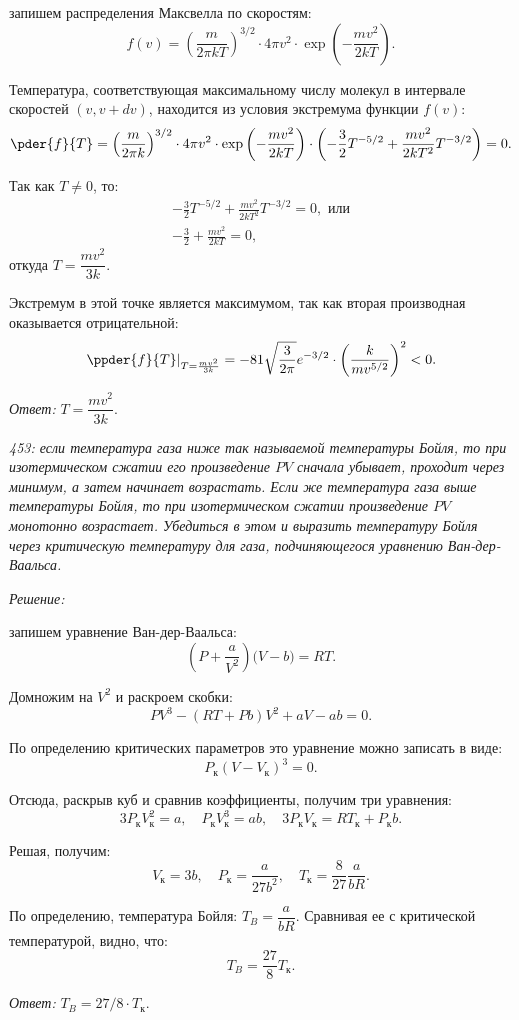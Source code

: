\documentclass[pscyr]{hedwork}
\begin{document}
запишем распределения Максвелла по скоростям:
\[
  f(v) = \left( \frac{m}{2\pi kT} \right)^{3/2}\cdot 4\pi v^2\cdot
   \exp\left( -\frac{mv^2}{2kT} \right).
\]

Температура, соответствующая максимальному числу молекул в интервале скоростей
\( (v, v + dv) \), находится из условия экстремума функции \( f(v) \):
\[
  \pder{f}{T} = \left( \frac{m}{2\pi k} \right)^{3/2}\cdot 4\pi v^2\cdot
    \exp\left( -\frac{mv^2}{2kT} \right)\cdot
    \left(-\frac{3}{2}T^{-5/2} + \frac{mv^2}{2kT^2}T^{-3/2} \right) = 0.
\]

Так как \( T \ne 0 \), то:
\begin{gather*}
  -\frac{3}{2}T^{-5/2} + \frac{mv^2}{2kT^2}T^{-3/2} = 0, \text{ или} \\
  -\frac{3}{2} + \frac{mv^2}{2kT} = 0,
\end{gather*}
откуда \( T = \dfrac{mv^2}{3k} \).

Экстремум в этой точке является максимумом, так как вторая производная
оказывается отрицательной:
\[
  \left. \ppder{f}{T} \right|_{T = \frac{mv^2}{3k}} = -81
  \sqrt{\frac{3}{2\pi}}e^{-3/2}\cdot \left( \frac{k}{mv^{5/2}} \right)^2 < 0.
\]

\vspace*{2em}
\emph{Ответ:} \( T = \dfrac{mv^2}{3k} \).

\newpage %

\emph{453: если температура газа ниже так называемой температуры Бойля, то при
изотермическом сжатии его произведение \( PV \) сначала убывает, проходит через
минимум, а затем начинает возрастать. Если же температура газа выше температуры
Бойля, то при изотермическом сжатии произведение \( PV \) монотонно возрастает.
Убедиться в этом и выразить температуру Бойля через критическую температуру для
газа, подчиняющегося уравнению Ван-дер-Ваальса.}

\vspace*{2em}
\emph{Решение:}

запишем уравнение Ван-дер-Ваальса:
\[
  \left( P + \frac{a}{V^2} \right)\Big( V - b \Big) = RT.
\]

Домножим на \( V^2 \) и раскроем скобки:
\[
  PV^3 - (RT + Pb)V^2 + aV - ab = 0.
\]

По определению критических параметров это уравнение можно записать в виде:
\[
  P_\text{к}(V - V_\text{к})^3 = 0.
\]

Отсюда, раскрыв куб и сравнив коэффициенты, получим три уравнения:
\[
  3P_\text{к}V_\text{к}^2 = a, \quad
  P_\text{к}V_\text{к}^3 = ab, \quad
  3P_\text{к}V_\text{к} = RT_\text{к} + P_\text{к}b.
\]

Решая, получим:
\[
  V_\text{к} = 3b, \quad
  P_\text{к} = \frac{a}{27b^2}, \quad
  T_\text{к} = \frac{8}{27}\frac{a}{bR}.
\]

По определению, температура Бойля: \( T_B = \dfrac{a}{bR} \).
Сравнивая ее с критической температурой, видно, что:
\[
  T_B = \frac{27}{8}T_\text{к}.
\]

\vspace*{2em}
\emph{Ответ:} \( T_B = 27/8\cdot T_\text{к} \).
\end{document}

